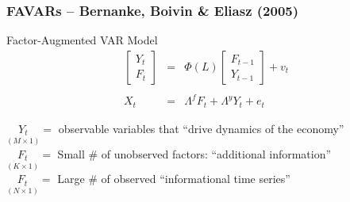 \documentclass[handout]{beamer}
\begin{document}
\begin{frame}[c]\frametitle{FAVARs -- Bernanke, Boivin \& Eliasz (2005)}

\begin{block}{Factor-Augmented VAR Model}
	\begin{eqnarray*}
		\left[\begin{array}
			{c} Y_t \\ F_t
		\end{array} \right] &=& \Phi(L)\left[\begin{array}
			{c} F_{t-1} \\ Y_{t-1}
		\end{array} \right] + v_t\\ \\
		X_t &=& \Lambda^f F_t + \Lambda^y Y_t + e_t
	\end{eqnarray*}

\vspace{2em}

\small
$\underset{(M\times 1)}{Y_t} = $  observable variables that ``drive dynamics of the economy''\\ \vspace{1em}
$\underset{(K\times 1)}{F_t} = $ Small \# of unobserved factors: ``additional information''\\ \vspace{1em}
$\underset{(N\times 1)}{F_t} = $ Large \# of observed ``informational time series''
\end{block}

\end{frame}
\end{document}
